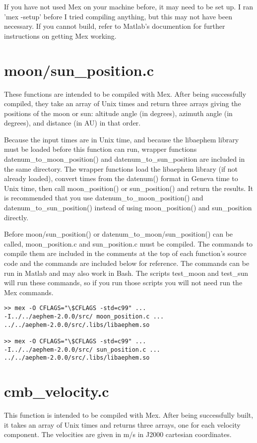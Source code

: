 \documentclass[12pt]{report}
\begin{document}
If you have not used Mex on your machine before, it may need to be set up.  I ran 'mex -setup' before I tried compiling anything, but this may not have been necessary.  If you cannot build, refer to Matlab's documention for further instructions on getting Mex working.

\section{moon/sun\_position.c}
These functions are intended to be compiled with Mex.  After being successfully compiled, they take an array of Unix times and return three arrays giving the positions of the moon or sun: altitude angle (in degrees), azimuth angle (in degrees), and distance (in AU) in that order.

Because the input times are in Unix time, and because the libaephem library must be loaded before this function can run, wrapper functions datenum\_to\_moon\_position() and datenum\_to\_sun\_position are included in the same directory.  The wrapper functions load the libaephem library (if not already loaded), convert times from the datenum() format in Geneva time to Unix time, then call moon\_position() or sun\_position() and return the results.  It is recommended that you use datenum\_to\_moon\_position() and datenum\_to\_sun\_position() instead of using moon\_position() and sun\_position directly.

Before moon/sun\_position() or datenum\_to\_moon/sun\_position() can be called, moon\_position.c and sun\_position.c must be compiled.  The commands to compile them are included in the comments at the top of each function's source code and the commands are included below for reference.  The commands can be run in Matlab and may also work in Bash.  The scripts test\_moon and test\_sun will run these commands, so if you run those scripts you will not need run the Mex commands.

\begin{verbatim}
>> mex -O CFLAGS="\$CFLAGS -std=c99" ...
-I../../aephem-2.0.0/src/ moon_position.c ...
../../aephem-2.0.0/src/.libs/libaephem.so

>> mex -O CFLAGS="\$CFLAGS -std=c99" ...
-I../../aephem-2.0.0/src/ sun_position.c ...
../../aephem-2.0.0/src/.libs/libaephem.so
\end{verbatim}

\section{cmb\_velocity.c}
This function is intended to be compiled with Mex.  After being successfully built, it takes an array of Unix times and returns three arrays, one for each velocity component.  The velocities are given in m/s in J2000 cartesian coordinates.
\end{document}
